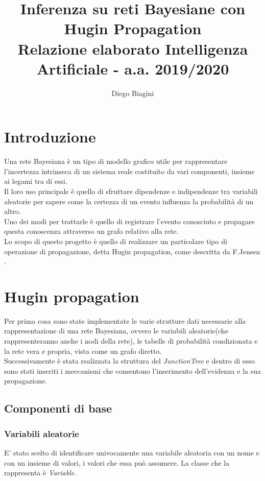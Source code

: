 \documentclass[a4paper]{article}
\title{%
  Inferenza su reti Bayesiane con Hugin Propagation \\
  \large Relazione elaborato Intelligenza Artificiale - a.a. 2019/2020}
\author{Diego Biagini}
\begin{document}
\maketitle


\section{Introduzione}
Una rete Bayesiana è un tipo di modello grafico utile per rappresentare l'incertezza intrinseca di un sistema reale costituito da vari componenti, insieme ai legami tra di essi.\\
Il loro uso principale è quello di sfruttare dipendenze e indipendenze tra variabili aleatorie per sapere come la certezza di un evento influenza la probabilità di un altro.\\
Uno dei modi per trattarle è quello di registrare l'evento conosciuto e propagare questa conoscenza attraverso un grafo relativo alla rete.\\
Lo scopo di questo progetto è quello di realizzare un particolare tipo di operazione di propagazione, detta Hugin propagation, come descritta da F.Jensen \autocite{jensen_bnet}.
\section{Hugin propagation}
Per prima cosa sono state implementate le varie strutture dati necessarie alla rappresentazione di una rete Bayesiana, ovvero le variabili aleatorie(che rappresenteranno anche i nodi della rete), le tabelle di probabilità condizionata e la rete vera e propria, vista come un grafo diretto.\\
Successivamente è stata realizzata la struttura del \emph{JunctionTree} e dentro di esso sono stati inseriti i meccanismi che consentono l'inserimento dell'evidenza e la sua propagazione.
\subsection{Componenti di base}
\subsubsection{Variabili aleatorie}
E' stato scelto di identificare univocamente una variabile aleatoria con un nome e con un insieme di valori, i valori che essa può assumere. La classe che la rappresenta è  \emph{Variable}.
\end{document}
